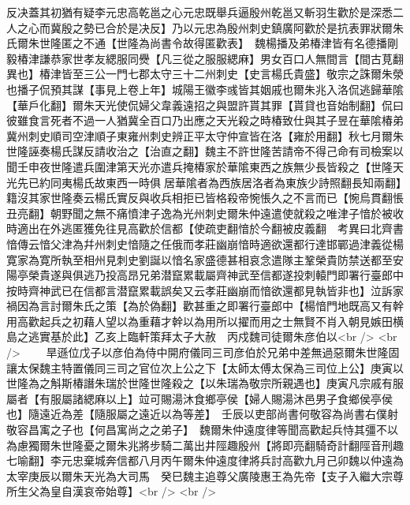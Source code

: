 反决蓋其初猶有疑李元忠高乾邕之心元忠既舉兵逼殷州乾邕又斬羽生歡於是深悉二人之心而冀殷之勢已合於是决反】乃以元忠為殷州刺史鎮廣阿歡於是抗表罪狀爾朱氏爾朱世隆匿之不通【世隆為尚書令故得匿歡表】　魏楊播及弟椿津皆有名德播剛毅椿津謙恭家世孝友緦服同㸑【凡三從之服服緦麻】男女百口人無間言【間古莧翻異也】椿津皆至三公一門七郡太守三十二州刺史【史言楊氏貴盛】敬宗之誅爾朱滎也播子侃預其謀【事見上卷上年】城陽王徽李彧皆其姻戚也爾朱兆入洛侃逃歸華隂【華戶化翻】爾朱天光使侃婦父韋義遠招之與盟許貰其罪【貰貸也音始制翻】侃曰彼雖食言死者不過一人猶冀全百口乃出應之天光殺之時椿致仕與其子昱在華隂椿弟冀州刺史順司空津順子東雍州刺史辨正平太守仲宣皆在洛【雍於用翻】秋七月爾朱世隆誣奏楊氏謀反請收治之【治直之翻】魏主不許世隆苦請帝不得己命有司檢案以聞壬申夜世隆遣兵圍津第天光亦遣兵掩椿家於華隂東西之族無少長皆殺之【世隆天光先已約同夷楊氏故東西一時俱居華隂者為西族居洛者為東族少詩照翻長知兩翻】籍沒其家世隆奏云楊氏實反與收兵相拒已皆格殺帝惋悵久之不言而已【惋烏貫翻悵丑亮翻】朝野聞之無不痛憤津子逸為光州刺史爾朱仲遠遣使就殺之唯津子愔於被收時適出在外逃匿獲免往見高歡於信都【使疏吏翻愔於今翻被皮義翻　考異曰北齊書愔傳云愔父津為幷州刺史愔隨之任俄而孝莊幽崩愔時適欲還都行達邯鄲過津義從楊寛家為寛所執至相州見刺史劉誕以愔名家盛德甚相哀念遣隊主鞏榮貴防禁送都至安陽亭榮貴遂與俱逃乃投高昂兄弟潜竄累載屬齊神武至信都遂投刺轅門即署行臺郎中按時齊神武已在信都言潜竄累載誤矣又云孝莊幽崩而愔欲還都見執皆非也】泣訴家禍因為言討爾朱氏之策【為於偽翻】歡甚重之即署行臺郎中【楊愔門地既高又有幹用高歡起兵之初藉人望以為重藉才幹以為用所以擢而用之士無賢不肖入朝見嫉田横島之逃實基於此】乙亥上臨軒策拜太子大赦　丙戍魏司徒爾朱彦伯以<br />
<br />
　　旱遜位戊子以彦伯為侍中開府儀同三司彦伯於兄弟中差無過惡爾朱世隆固讓太保魏主特置儀同三司之官位次上公之下【太師太傅太保為三司位上公】庚寅以世隆為之斛斯椿譖朱瑞於世隆世隆殺之【以朱瑞為敬宗所親遇也】庚寅凡宗戚有服屬者【有服屬諸緦麻以上】竝可賜湯沐食鄉亭侯【婦人賜湯沐邑男子食鄉侯亭侯也】隨遠近為差【隨服屬之遠近以為等差】　壬辰以吏部尚書何敬容為尚書右僕射敬容昌㝢之子也【何昌寓尚之之弟子】　魏爾朱仲遠度律等聞高歡起兵恃其彊不以為慮獨爾朱世隆憂之爾朱兆將步騎二萬出井陘趣殷州【將即亮翻騎奇計翻陘音刑趣七喻翻】李元忠棄城奔信都八月丙午爾朱仲遠度律將兵討高歡九月己卯魏以仲遠為太宰庚辰以爾朱天光為大司馬　癸巳魏主追尊父廣陵惠王為先帝【支子入繼大宗尊所生父為皇自漢哀帝始尊】<br />
<br />
